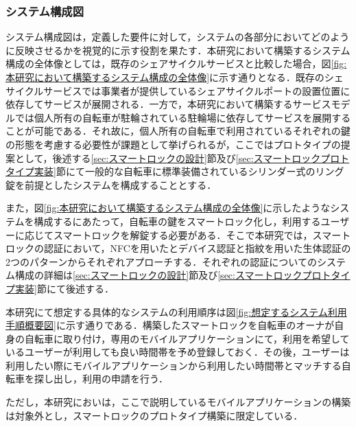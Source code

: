       \subsubsection{システム構成図}
        \label{sec:システム構成図}
          \par システム構成図は，定義した要件に対して，システムの各部分においてどのように反映させるかを視覚的に示す役割を果たす．本研究において構築するシステム構成の全体像としては，既存のシェアサイクルサービスと比較した場合，図\ref{fig:本研究において構築するシステム構成の全体像}に示す通りとなる．既存のシェサイクルサービスでは事業者が提供しているシェアサイクルポートの設置位置に依存してサービスが展開される．一方で，本研究において構築するサービスモデルでは個人所有の自転車が駐輪されている駐輪場に依存してサービスを展開することが可能である．それ故に，個人所有の自転車で利用されているそれぞれの鍵の形態を考慮する必要性が課題として挙げられるが，ここではプロトタイプの提案として，後述する\ref{sec:スマートロックの設計}節及び\ref{sec:スマートロックプロトタイプ実装}節にて一般的な自転車に標準装備されているシリンダー式のリング錠を前提としたシステムを構成することとする．
           \par また，図\ref{fig:本研究において構築するシステム構成の全体像}に示したようなシステムを構成するにあたって，自転車の鍵をスマートロック化し，利用するユーザーに応じてスマートロックを解錠する必要がある．そこで本研究では，スマートロックの認証において，NFCを用いたとデバイス認証と指紋を用いた生体認証の2つのパターンからそれぞれアプローチする．それぞれの認証についてのシステム構成の詳細は\ref{sec:スマートロックの設計}節及び\ref{sec:スマートロックプロトタイプ実装}節にて後述する．
           \par 本研究にて想定する具体的なシステムの利用順序は図\ref{fig:想定するシステム利用手順概要図}に示す通りである．構築したスマートロックを自転車のオーナが自身の自転車に取り付け，専用のモバイルアプリケーションにて，利用を希望しているユーザーが利用しても良い時間帯を予め登録しておく．その後，ユーザーは利用したい際にモバイルアプリケーションから利用したい時間帯とマッチする自転車を探し出し，利用の申請を行う．
           \par ただし，本研究においは，ここで説明しているモバイルアプリケーションの構築は対象外とし，スマートロックのプロトタイプ構築に限定している．
          
